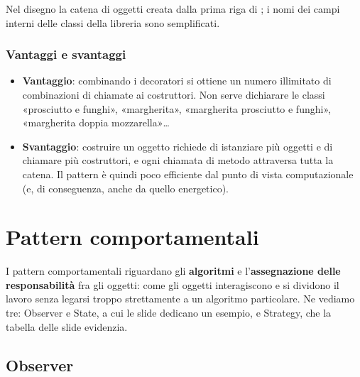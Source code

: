\medskip
Nel disegno la catena di oggetti creata dalla prima riga di ; i nomi dei campi interni delle classi della libreria
sono semplificati.

\subsubsection*{Vantaggi e svantaggi}

\begin{itemize}
  \item \textbf{Vantaggio}: combinando i decoratori si ottiene un numero illimitato di combinazioni di chiamate ai
        costruttori. Non serve dichiarare le classi «prosciutto e funghi», «margherita», «margherita prosciutto e funghi»,
        «margherita doppia mozzarella»\ldots
  \item \textbf{Svantaggio}: costruire un oggetto richiede di istanziare più oggetti e di chiamare più costruttori, e ogni
        chiamata di metodo attraversa tutta la catena. Il pattern è quindi poco efficiente dal punto di vista
        computazionale (e, di conseguenza, anche da quello energetico).
\end{itemize}

\section{Pattern comportamentali}

I pattern comportamentali riguardano gli \textbf{algoritmi} e l'\textbf{assegnazione delle responsabilità} fra gli oggetti:
come gli oggetti interagiscono e si dividono il lavoro senza legarsi troppo strettamente a un algoritmo particolare. Ne
vediamo tre: Observer e State, a cui le slide dedicano un esempio, e Strategy, che la tabella delle slide evidenzia.

\subsection{Observer}



